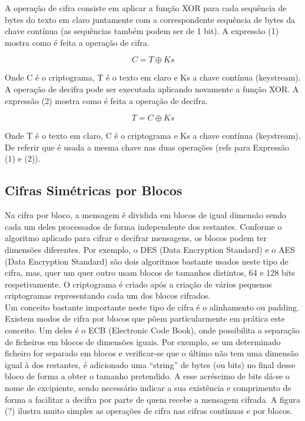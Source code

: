 \documentclass[a4paper,11pt,openright,oneside]{report}
\begin{document}
A operação de cifra consiste em aplicar a função XOR para cada sequência de bytes do texto em claro juntamente com a correspondente sequência de bytes da chave contínua (as sequências também podem ser de 1 bit). A expressão (1) mostra como é feita a operação de cifra.

\begin{equation}
C = T \oplus Ks
\end{equation}

Onde C é o criptograma, T é o texto em claro e Ks a chave contínua (keystream).\\

A operação de decifra pode ser executada aplicando novamente a função XOR. A expressão (2) mostra como é feita a operação de decifra.

\begin{equation}
T = C \oplus Ks
\end{equation}

Onde T é o texto em claro, C é o criptograma e Ks a chave contínua (keystream).\\

De referir que é usada a mesma chave nas duas operações (refs para Expressão (1) e (2)).

\subsection{Cifras Simétricas por Blocos}

Na cifra por bloco, a mensagem é dividida em blocos de igual dimensão sendo cada um deles processados de forma independente dos restantes. Conforme o algoritmo aplicado para cifrar e decifrar mensagens, os blocos podem ter dimensões diferentes. Por exemplo, o DES (Data Encryption Standard) e o AES (Data Encryption Standard) são dois algoritmos bastante usados neste tipo de cifra, mas, quer um quer outro usam blocos de tamanhos distintos, 64 e 128 bits respetivamente. O criptograma é criado após a criação de vários pequenos criptogramas representando cada um dos blocos cifrados.\\

Um conceito bastante importante neste tipo de cifra é o alinhamento ou padding. Existem modos de cifra por blocos que põem particularmente em prática este conceito. Um deles é o ECB (Electronic Code Book), onde possibilita a separação de ficheiros em blocos de dimensões iguais. Por exemplo, se um determinado ficheiro for separado em blocos e verificar-se que o último não tem uma dimensão igual à dos restantes, é adicionado uma “string” de bytes (ou bits) no final desse bloco de forma a obter o tamanho pretendido. A esse acréscimo de bits dá-se o nome de excipiente, sendo necessário indicar a sua existência e comprimento de forma a facilitar a decifra por parte de quem recebe a mensagem cifrada. A figura (?) ilustra muito simples as operações de cifra nas cifras contínuas e por blocos.
\end{document}
